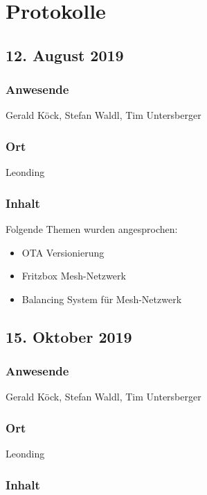 \chapter*{Protokolle}

\section*{12. August 2019}

\subsection*{Anwesende}

Gerald Köck, Stefan Waldl, Tim Untersberger

\subsection*{Ort}

Leonding

\subsection*{Inhalt}

Folgende Themen wurden angesprochen:

\begin{itemize}
  \item OTA Versionierung
  \item Fritzbox Mesh-Netzwerk
  \item Balancing System für Mesh-Netzwerk
\end{itemize}

\pagebreak

\section*{15. Oktober 2019}

\subsection*{Anwesende}

Gerald Köck, Stefan Waldl, Tim Untersberger

\subsection*{Ort}

Leonding

\subsection*{Inhalt}

